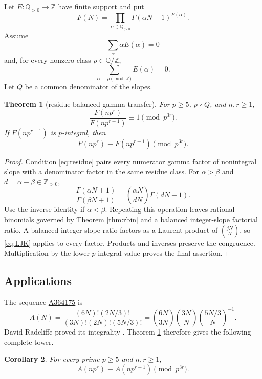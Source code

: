 \documentclass[11pt]{article}
\newtheorem{theorem}{Theorem}[section]
\newtheorem{corollary}[theorem]{Corollary}
\theoremstyle{definition}
\newcommand{\Z}{\mathbb Z}
\newcommand{\Q}{\mathbb Q}
\newcommand{\OEIS}[1]{\href{https://oeis.org/#1}{#1}}
\begin{document}
Let $E:\Q_{>0}\to\Z$ have finite support and put
\[
 F(N)=\prod_{\alpha\in\Q_{>0}}\Gamma(\alpha N+1)^{E(\alpha)}.
\]
Assume
\begin{equation}\label{eq:slope}
 \sum_\alpha \alpha E(\alpha)=0
\end{equation}
and, for every nonzero class $\rho\in\Q/\Z$,
\begin{equation}\label{eq:residue}
 \sum_{\alpha\equiv\rho\pmod\Z}E(\alpha)=0.
\end{equation}
Let $Q$ be a common denominator of the slopes.

\begin{theorem}[residue-balanced gamma transfer]\label{thm:gamma}
For $p\geq5$, $p\nmid Q$, and $n,r\geq1$,
\[
 \frac{F(np^r)}{F(np^{r-1})}\equiv1\pmod {p^{3r}}.
\]
If $F(np^{r-1})$ is $p$-integral, then
\[
 F(np^r)\equiv F(np^{r-1})\pmod {p^{3r}}.
\]
\end{theorem}

\begin{proof}
Condition \eqref{eq:residue} pairs every numerator gamma factor of
nonintegral slope with a denominator factor in the same residue class.
For $\alpha>\beta$ and $d=\alpha-\beta\in\Z_{>0}$,
\[
 \frac{\Gamma(\alpha N+1)}{\Gamma(\beta N+1)}
 =\binom{\alpha N}{dN}\Gamma(dN+1).
\]
Use the inverse identity if $\alpha<\beta$.  Repeating this operation leaves
rational binomials governed by Theorem \ref{thm:rbin} and a balanced
integer-slope factorial ratio.  A balanced integer-slope ratio factors as a
Laurent product of $\binom{jN}{N}$, so \eqref{eq:LJK} applies to every
factor.  Products and inverses preserve the congruence.  Multiplication by
the lower $p$-integral value proves the final assertion.
\end{proof}

\subsection{Applications}

The sequence \OEIS{A364175} is
\[
 A(N)=\frac{(6N)!(2N/3)!}{(3N)!(2N)!(5N/3)!}
 =\binom{6N}{3N}\binom{3N}{N}\binom{5N/3}{N}^{-1}.
\]
David Radcliffe proved its integrality \cite{Radcliffe}.  Theorem
\ref{thm:gamma} therefore gives the following complete tower.

\begin{corollary}\label{cor:a364175}
For every prime $p\geq5$ and $n,r\geq1$,
\[
 A(np^r)\equiv A(np^{r-1})\pmod {p^{3r}}.
\]
\end{corollary}
\end{document}
